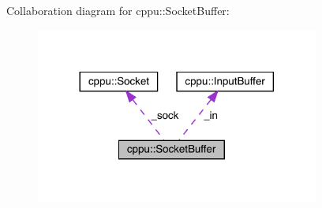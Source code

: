 Collaboration diagram for cppu\+::Socket\+Buffer\+:
\nopagebreak
\begin{figure}[H]
\begin{center}
\leavevmode
\includegraphics[width=264pt]{classcppu_1_1_socket_buffer__coll__graph}
\end{center}
\end{figure}
